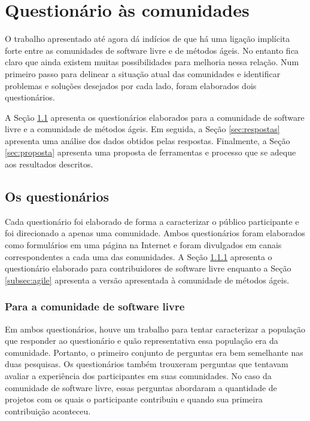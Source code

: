 \chapter{Questionário às comunidades}
\label{cap:pesquisas}

O trabalho apresentado até agora dá indícios de que há uma ligação
implícita forte entre as comunidades de software livre e de métodos
ágeis. No entanto fica claro que ainda existem muitas possibilidades
para melhoria nessa relação. Num primeiro passo para delinear a
situação atual das comunidades e identificar problemas e soluções
desejados por cada lado, foram elaborados dois questionários.

A Seção \ref{sec:questionarios} apresenta os questionários elaborados
para a comunidade de software livre e a comunidade de métodos
ágeis. Em seguida, a Seção \ref{sec:respostas} apresenta uma análise
dos dados obtidos pelas respostas. Finalmente, a Seção
\ref{sec:proposta} apresenta uma proposta de ferramentas e processo
que se adeque aos resultados descritos.

\section{Os questionários}
\label{sec:questionarios}

Cada questionário foi elaborado de forma a caracterizar o público
participante e foi direcionado a apenas uma comunidade. Ambos
questionários foram elaborados como formulários em uma página na
Internet e foram divulgados em canais correspondentes a cada uma das
comunidades. A Seção \ref{subsec:floss} apresenta o questionário
elaborado para contribuidores de software livre enquanto a Seção
\ref{subsec:agile} apresenta a versão apresentada à comunidade de
métodos ágeis.

\subsection{Para a comunidade de software livre}
\label{subsec:floss}

Em ambos questionários, houve um trabalho para tentar caracterizar a
população que responder ao questionário e quão representativa essa
população era da comunidade. Portanto, o primeiro conjunto de
perguntas era bem semelhante nas duas pesquisas. Os questionários
também trouxeram perguntas que tentavam avaliar a experiência dos
participantes em suas comunidades. No caso da comunidade de software
livre, essas perguntas abordaram a quantidade de projetos com os quais
o participante contribuiu e quando sua primeira contribuição
aconteceu.

